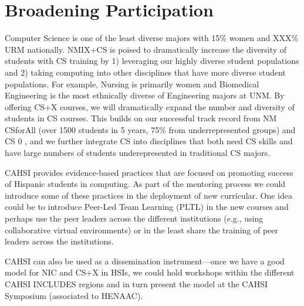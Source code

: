\section{Broadening Participation}
Computer Science is one of the least diverse majors with 15\% women and XXX\% URM nationally. NMIX+CS is poised to dramatically increase the diversity of students with CS training by 1) leveraging our highly diverse student populations and 2) taking computing into other disciplines that have more diverse student populations. For example, Nursing is primarily women and Biomedical Engineering is the most ethnically diverse of Engineering majors at UNM. By offering CS+X courses, we will dramatically expand the number and diversity of students in CS courses. This builds on our successful track record from NM CSforAll (over 1500 students in 5 years, 75\% from underrepresented groups) and CS 0 , and we further integrate CS into disciplines that both need CS skills and have large numbers of students underepresented in traditional CS majors.



CAHSI provides evidence-based practices that are focused on promoting success of Hispanic students in computing. As part of the mentoring process we could introduce some of these practices in the deployment of new curricular. One idea could be to introduce Peer-Led Team Learning (PLTL) in the new courses and perhaps use the peer leaders across the different institutions (e.g., using collaborative virtual environments) or in the least share the training of peer leaders across the institutions. 

CAHSI can also be used as a dissemination instrument---once we have a good model for NIC and CS+X in HSIs, we could hold workshops within the different CAHSI INCLUDES regions and in turn present the model at the CAHSI Symposium (associated to HENAAC).